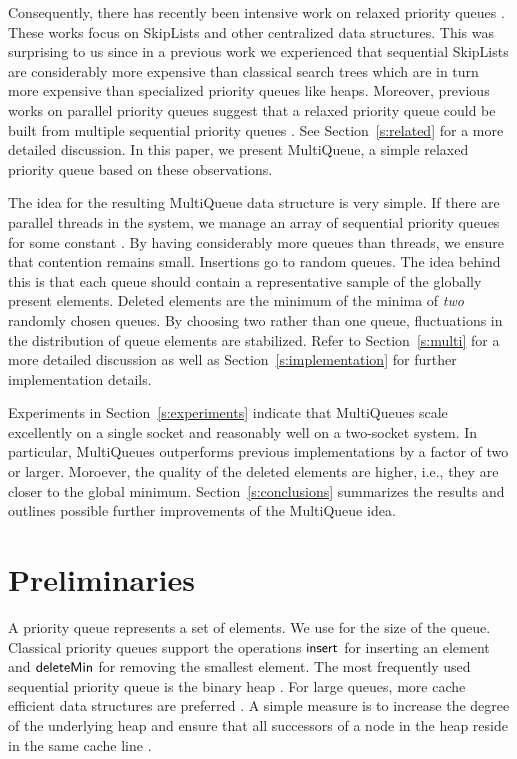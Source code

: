 \documentclass[a4paper,12pt]{article}
\newcommand{\Id}[1]{\ensuremath{\text{{\sf #1}}}}
\begin{document}
Consequently, there has recently been intensive work on relaxed priority queues \cite{AKLS14,WVTCT14,HKPSS13}. These works focus on SkipLists and other centralized data structures.  This was surprising to us since in a previous work we experienced that sequential SkipLists are considerably more expensive than classical search trees \cite{DKMS04} which are in turn more expensive than specialized priority queues like heaps. Moreover, previous works on parallel priority queues suggest that a relaxed priority queue could be built from multiple sequential priority queues \cite{DeoPra92,RanEtAl94,San98a}. See Section~\ref{s:related} for a more detailed discussion. In this paper, we present MultiQueue, a simple relaxed priority queue based on these observations. 

The idea for the resulting MultiQueue data structure is very simple.
If there are  parallel threads in the system, we manage an array of  sequential priority queues for some constant . By having considerably more queues than threads, we ensure that contention remains small. Insertions go to random queues. The idea behind this is that each queue should contain a representative sample of the globally present elements. Deleted elements are the minimum of the minima of \emph{two} randomly chosen queues. By choosing two rather than one queue, fluctuations in the distribution of queue elements are stabilized. Refer to Section~\ref{s:multi} for a more detailed discussion as well as Section~\ref{s:implementation} for further implementation details.

Experiments in Section~\ref{s:experiments} indicate that MultiQueues scale excellently on a single socket and reasonably well on a two-socket system. 
In particular, MultiQueues outperforms previous implementations by a factor of two or larger. Moroever, the quality of the deleted elements are higher, i.e., they are closer to the global minimum.
Section~\ref{s:conclusions} summarizes the results and outlines possible further improvements of the MultiQueue idea.


\section{Preliminaries}
\label{s:prelim}

A priority queue  represents a set of elements. We use  for the size of the queue. Classical priority queues support the operations \Id{insert} for inserting an element and \Id{deleteMin} for removing the smallest element. 
The most frequently used sequential priority queue is the binary heap \cite{Wil64}. For large queues, more cache efficient data structures are preferred
\cite{LaMLad97a,San00b}. A simple measure is to increase the degree of the underlying heap and ensure that all successors of a node in the heap reside in the same cache line \cite{LaMLad97a}.
\end{document}
